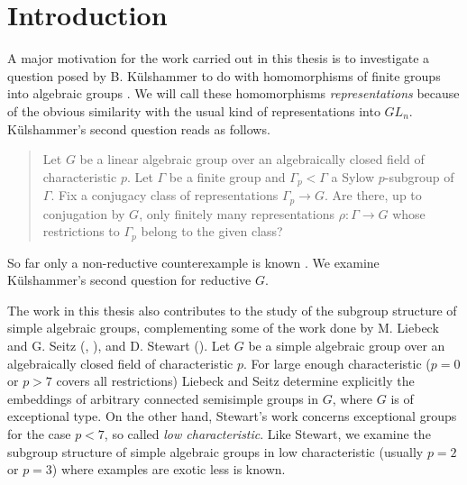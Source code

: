 
\chapter{Introduction}
\label{Chapter1}

A major motivation for the work carried out in this thesis is to investigate a question posed by B. K\"ulshammer to do with homomorphisms of finite groups into algebraic groups \cite{slodowy1997two}. We will call these homomorphisms \emph{representations} because of the obvious similarity with the usual kind of representations into $GL_n$. K\"ulshammer's second question reads as follows.
\begin{quote}
  Let $G$ be a linear algebraic group over an algebraically closed field of characteristic $p$. Let $\Gamma$ be a finite group and $\Gamma_p < \Gamma$ a Sylow $p$-subgroup of $\Gamma$. Fix a conjugacy class of representations $\Gamma_p\rightarrow G$. Are there, up to conjugation by $G$, only finitely many representations $\rho:\Gamma\rightarrow G$ whose restrictions to $\Gamma_p$ belong to the given class?
\end{quote}

So far only a non-reductive counterexample is known \cite[Appendix]{slodowy1997two}. We examine K\"ulshammer's second question for reductive $G$. 


The work in this thesis also contributes to the study of the subgroup structure of simple algebraic groups, complementing some of the work done by M. Liebeck and G. Seitz (\cite{liebeck1996reductive}, \cite{liebeck2004maximal}), and D. Stewart (\cite{stewart2010g}).
Let $G$ be a simple algebraic group over an algebraically closed field of characteristic $p$. For large enough characteristic ($p=0$ or $p>7$ covers all restrictions) Liebeck and Seitz determine explicitly the embeddings of arbitrary connected semisimple groups in $G$, where $G$ is of exceptional type.
On the other hand, Stewart's work concerns exceptional groups for the case $p<7$, so called \emph{low characteristic}.
Like Stewart, we examine the subgroup structure of simple algebraic groups in low characteristic (usually $p=2$ or $p=3$) where examples are exotic less is known. 

